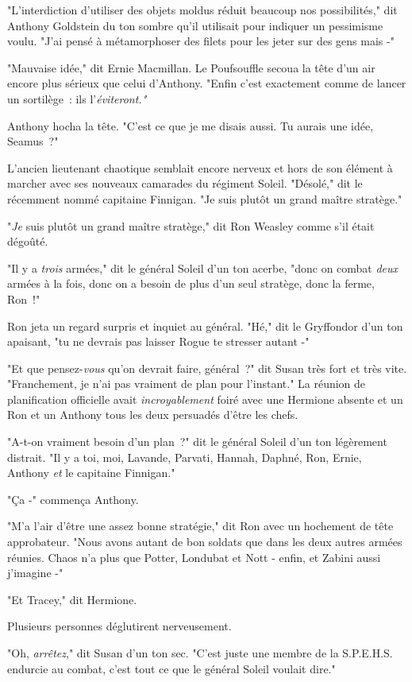 "L'interdiction d'utiliser des objets moldus réduit beaucoup nos possibilités," dit Anthony Goldstein du ton sombre qu'il utilisait pour indiquer un pessimisme voulu. "J'ai pensé à métamorphoser des filets pour les jeter sur des gens mais -"

"Mauvaise idée," dit Ernie Macmillan. Le Poufsouffle secoua la tête d'un air encore plus sérieux que celui d'Anthony. "Enfin c'est exactement comme de lancer un sortilège~: ils l'\emph{éviteront."}

Anthony hocha la tête. "C'est ce que je me disais aussi. Tu aurais une idée, Seamus~?"

L'ancien lieutenant chaotique semblait encore nerveux et hors de son élément à marcher avec ses nouveaux camarades du régiment Soleil. "Désolé," dit le récemment nommé capitaine Finnigan. "Je suis plutôt un grand maître stratège."

"\emph{Je} suis plutôt un grand maître stratège," dit Ron Weasley comme s'il était dégoûté.

"Il y a \emph{trois} armées," dit le général Soleil d'un ton acerbe, "donc on combat \emph{deux} armées à la fois, donc on a besoin de plus d'un seul stratège, donc la ferme, Ron~!"

Ron jeta un regard surpris et inquiet au général. "Hé," dit le Gryffondor d'un ton apaisant, "tu ne devrais pas laisser Rogue te stresser autant -"

"Et que pensez-\emph{vous} qu'on devrait faire, général~?" dit Susan très fort et très vite. "Franchement, je n'ai pas vraiment de plan pour l'instant." La réunion de planification officielle avait \emph{incroyablement} foiré avec une Hermione absente et un Ron et un Anthony tous les deux persuadés d'être les chefs.

"A-t-on vraiment besoin d'un plan~?" dit le général Soleil d'un ton légèrement distrait. "Il y a toi, moi, Lavande, Parvati, Hannah, Daphné, Ron, Ernie, Anthony \emph{et} le capitaine Finnigan."

"Ça -" commença Anthony.

"M'a l'air d'être une assez bonne stratégie," dit Ron avec un hochement de tête approbateur. "Nous avons autant de bon soldats que dans les deux autres armées réunies. Chaos n'a plus que Potter, Londubat et Nott - enfin, et Zabini aussi j'imagine -"

"Et Tracey," dit Hermione.

Plusieurs personnes déglutirent nerveusement.

"Oh, \emph{arrêtez}," dit Susan d'un ton sec. "C'est juste une membre de la S.P.E.H.S. endurcie au combat, c'est tout ce que le général Soleil voulait dire."

